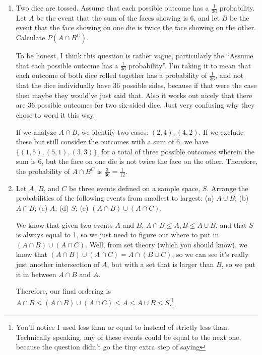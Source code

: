 \documentclass{article}
\begin{document}
\begin{enumerate}
    \item Two dice are tossed. Assume that each possible outcome has a \(\frac{1}{36}\) probability. Let \(A\) be the event that the sum of the faces showing is 6, and let \(B\) be the event that
    the face showing on one die is twice the face showing on the other. Calculate \(P(A \cap{} B^C)\).\begin{solution}
        To be honest, I think this question is rather vague, particularly the ``Assume that each possible outcome has a \(\frac{1}{36}\) probability''. I'm taking it to mean that each outcome of both
        dice rolled together has a probability of \(\frac{1}{36}\), and not that the dice individually have 36 possible sides, because if that were the case then maybe they would've just said that.
        Also it works out nicely that there are 36 possible outcomes for two six-sided dice. Just very confusing why they chose to word it this way.\par 
        If we analyze \(A\cap{}B\), we identify two cases: \((2,4), (4,2)\). If we exclude these but still consider the outcomes with a sum of 6, we have \(\lbrace (1,5), (5,1), (3,3) 
        \rbrace\), for a total of three possible outcomes wherein the sum is 6, but the face on one die is not twice the face on the other. Therefore, the probability of \(A\cap{}B^C\) is \(\frac{3}{36} 
        = \frac{1}{12}\). 
    \end{solution}
    \item Let \(A\), \(B\), and \(C\) be three events defined on a sample space, \(S\). Arrange the probabilities of the following events from smallest to largest:
    (a) \(A\cup B\); (b) \(A \cap B\); (c) \(A\); (d) \(S\); (e) \((A \cap{} B) \cup (A \cap C) \).\begin{solution}
        We know that given two events \(A\) and \(B\), \(A\cap{}B \leq A,B \leq A\cup{}B\), and that \(S\) is always equal to 1, so we just need to figure out where to put in \((A\cap{}B)\cup(A\cap{}C)\). 
        Well, from set theory (which you should know), we know that \((A\cap{}B)\cup(A\cap{}C) = A\cap{}(B\cup{}C)\), so we can see it's really just another intersection of \(A\), but with a set that is 
        larger than \(B\), so we put it in between \(A\cap{}B\) and \(A\).\par Therefore, our final ordering is \(A\cap{}B\leq(A\cap{}B)\cup(A\cap{}C)\leq{}A\leq{}A\cup{}B\leq{}S\).\footnote{You'll notice 
        I used less than or equal to instead of strictly less than. Technically speaking, any of these events could be equal to the next one, because the question didn't go the tiny extra step of saying 
}
\end{solution}
\end{enumerate}
\end{document}

